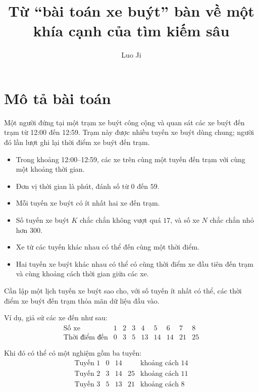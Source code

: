 \documentclass[11pt]{article}
\title{Từ ``bài toán xe buýt'' bàn về một khía cạnh của tìm kiếm sâu}
\author{Luo Ji}
\date{}
\begin{document}
\maketitle


\section{Mô tả bài toán}

Một người đứng tại một trạm xe buýt công cộng và quan sát các xe buýt đến
trạm từ 12:00 đến 12:59. Trạm này được nhiều tuyến xe buýt dùng chung; người
đó lần lượt ghi lại thời điểm xe buýt đến trạm.

\begin{itemize}
  \item Trong khoảng 12:00--12:59, các xe trên cùng một tuyến đến trạm với
  cùng một khoảng thời gian.
  \item Đơn vị thời gian là phút, đánh số từ $0$ đến $59$.
  \item Mỗi tuyến xe buýt có ít nhất hai xe đến trạm.
  \item Số tuyến xe buýt $K$ chắc chắn không vượt quá $17$, và số xe $N$ chắc
  chắn nhỏ hơn $300$.
  \item Xe từ các tuyến khác nhau có thể đến cùng một thời điểm.
  \item Hai tuyến xe buýt khác nhau có thể có cùng thời điểm xe đầu tiên đến
  trạm và cùng khoảng cách thời gian giữa các xe.
\end{itemize}

Cần lập một lịch tuyến xe buýt sao cho, với số tuyến ít nhất có thể, các thời
điểm xe buýt đến trạm thỏa mãn dữ liệu đầu vào.

Ví dụ, giả sử các xe đến như sau:
\[
\begin{array}{c|cccccccc}
\text{Số xe} & 1 & 2 & 3 & 4 & 5 & 6 & 7 & 8\\
\hline
\text{Thời điểm đến} & 0 & 3 & 5 & 13 & 14 & 14 & 21 & 25
\end{array}
\]

Khi đó có thể có một nghiệm gồm ba tuyến:
\[
\begin{array}{c|ccc|c}
\text{Tuyến 1} & 0 & 14 & & \text{khoảng cách }14\\
\text{Tuyến 2} & 3 & 14 & 25 & \text{khoảng cách }11\\
\text{Tuyến 3} & 5 & 13 & 21 & \text{khoảng cách }8
\end{array}
\]
\end{document}
